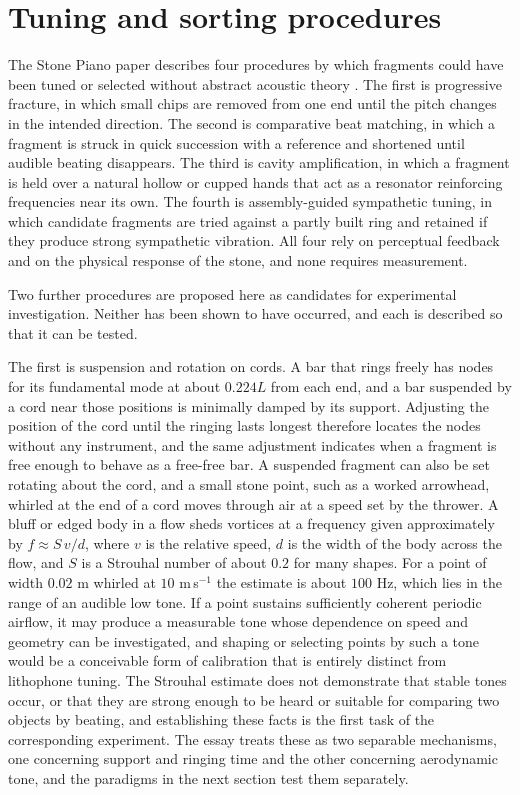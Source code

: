 \documentclass[12pt]{article}
\begin{document}
\section{Tuning and sorting procedures}

The Stone Piano paper describes four procedures by which fragments could have been tuned or selected without abstract acoustic theory \cite{stonepiano}. The first is progressive fracture, in which small chips are removed from one end until the pitch changes in the intended direction. The second is comparative beat matching, in which a fragment is struck in quick succession with a reference and shortened until audible beating disappears. The third is cavity amplification, in which a fragment is held over a natural hollow or cupped hands that act as a resonator reinforcing frequencies near its own. The fourth is assembly-guided sympathetic tuning, in which candidate fragments are tried against a partly built ring and retained if they produce strong sympathetic vibration. All four rely on perceptual feedback and on the physical response of the stone, and none requires measurement.

Two further procedures are proposed here as candidates for experimental investigation. Neither has been shown to have occurred, and each is described so that it can be tested.

The first is suspension and rotation on cords. A bar that rings freely has nodes for its fundamental mode at about $0.224L$ from each end, and a bar suspended by a cord near those positions is minimally damped by its support. Adjusting the position of the cord until the ringing lasts longest therefore locates the nodes without any instrument, and the same adjustment indicates when a fragment is free enough to behave as a free-free bar. A suspended fragment can also be set rotating about the cord, and a small stone point, such as a worked arrowhead, whirled at the end of a cord moves through air at a speed set by the thrower. A bluff or edged body in a flow sheds vortices at a frequency given approximately by $f \approx S\,v/d$, where $v$ is the relative speed, $d$ is the width of the body across the flow, and $S$ is a Strouhal number of about $0.2$ for many shapes. For a point of width $0.02$ m whirled at $10$ m\,s$^{-1}$ the estimate is about $100$ Hz, which lies in the range of an audible low tone. If a point sustains sufficiently coherent periodic airflow, it may produce a measurable tone whose dependence on speed and geometry can be investigated, and shaping or selecting points by such a tone would be a conceivable form of calibration that is entirely distinct from lithophone tuning. The Strouhal estimate does not demonstrate that stable tones occur, or that they are strong enough to be heard or suitable for comparing two objects by beating, and establishing these facts is the first task of the corresponding experiment. The essay treats these as two separable mechanisms, one concerning support and ringing time and the other concerning aerodynamic tone, and the paradigms in the next section test them separately.
\end{document}
